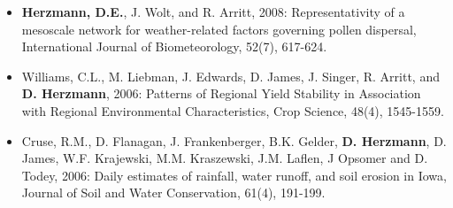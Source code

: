 \begin{itemize}
\item \textbf{Herzmann, D.E.}, J. Wolt, and R. Arritt, 2008: Representativity of a mesoscale network for weather-related factors governing pollen dispersal, International Journal of Biometeorology, 52(7), 617-624.
\item Williams, C.L., M. Liebman, J. Edwards, D. James, J. Singer, R. Arritt, and \textbf{D. Herzmann}, 2006: Patterns of Regional Yield Stability in Association with Regional Environmental Characteristics, Crop Science, 48(4), 1545-1559.
\item Cruse, R.M., D. Flanagan, J. Frankenberger, B.K. Gelder, \textbf{D. Herzmann}, D. James, W.F. Krajewski, M.M. Kraszewski, J.M. Laflen, J Opsomer and D. Todey, 2006: Daily estimates of rainfall, water runoff, and soil erosion in Iowa, Journal of Soil and Water Conservation, 61(4), 191-199.
\end{itemize}

